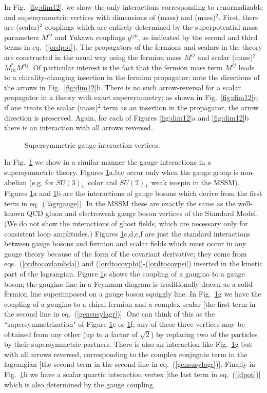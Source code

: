 In Fig.~\ref{fig:dim12}, we show the only
interactions corresponding to renormalizable
and supersymmetric vertices with dimensions of (mass) and (mass)$^2$.
First, there are
(scalar)$^3$ couplings which are entirely determined by the
superpotential mass parameters $M^{ij}$ and
Yukawa couplings $y^{ijk}$, as
indicated by the second and third terms in eq.~(\ref{ordpot}). The
propagators of the fermions and
scalars in the theory are constructed in the usual way using
the fermion mass $M^{ij}$ and scalar (mass)$^2$ $M^*_{in}M^{nj}$.
Of particular interest is the fact that the
fermion mass term $M^{ij}$ leads to a chirality-changing
insertion in the fermion propagator; note the directions of the
arrows in Fig.~\ref{fig:dim12}b. There is no such arrow-reversal for a
scalar
propagator in a theory with exact supersymmetry; as shown in
Fig.~\ref{fig:dim12}c, if one treats the scalar (mass)$^2$ term as an
insertion in the
propagator, the arrow direction is preserved. Again, for each of Figures
\ref{fig:dim12}a and \ref{fig:dim12}b there is an interaction with all
arrows reversed.

\begin{figure}
\centerline{}
\caption{Supersymmetric gauge interaction vertices.
\label{fig:gauge}}
\end{figure}
In Fig.~\ref{fig:gauge} we show in a similar manner the gauge interactions
in a supersymmetric theory.
Figures \ref{fig:gauge}a,b,c occur only when the gauge group is
non-abelian
(e.g. for $SU(3)_C$ color and $SU(2)_L$ weak isospin in the MSSM).
Figures \ref{fig:gauge}a and \ref{fig:gauge}b are the interactions of
gauge bosons which derive from
the first term in eq.~(\ref{lagrgauge}).
In the MSSM these are exactly the same as the
well-known QCD gluon and electroweak gauge boson vertices of the Standard
Model.
(We do not show the interactions of ghost fields, which
are necessary only for consistent loop amplitudes.)
Figures \ref{fig:gauge}c,d,e,f are just the standard interactions between
gauge bosons
and fermion and scalar fields
which must
occur in any gauge theory because of the form of the covariant
derivative; they come from eqs.~(\ref{ordtocovlambda}) and
(\ref{ordtocovphi})-(\ref{ordtocovpsi}) inserted in the kinetic part
of the lagrangian.
Figure \ref{fig:gauge}c shows the coupling of a gaugino
to a gauge boson; the gaugino line in a Feynman diagram is
traditionally drawn as a solid fermion line superimposed on a gauge boson
squiggly line. In Fig.~\ref{fig:gauge}g
we have the coupling of a gaugino to a chiral fermion and a complex
scalar [the first term in the second line in eq.~(\ref{gensusylagr})]. One
can think of
this as the ``supersymmetrization" of
Figure \ref{fig:gauge}e or \ref{fig:gauge}f; any of these three vertices
may be obtained from any
other (up to a factor of ${\sqrt{2}}$) by replacing two
of the particles by their supersymmetric partners. There is also an
interaction like Fig.~\ref{fig:gauge}g but with all arrows reversed,
corresponding to the complex conjugate term in the lagrangian
[the second term in the second line in eq.~(\ref{gensusylagr})]. Finally
in Fig.~\ref{fig:gauge}h we have a scalar quartic interaction vertex [the
last term in
eq.~(\ref{fdpot})] which is also determined by
the gauge coupling.

